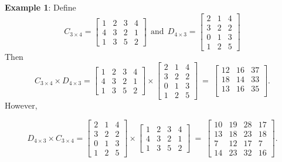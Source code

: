 \documentclass[
]{book}
\begin{document}
\textbf{Example 1}: Define
\[
C_{3\times 4} = \left[\begin{array}{ccccc} 
1& 2 & 3 & 4  \\ 
4 & 3 & 2 & 1 \\ 
1 & 3 & 5 & 2  
\end{array}
\right]
~
~
\text{and}
~
~
D_{4\times 3} = \left[\begin{array}{ccccc} 
2 & 1 & 4   \\ 
3 & 2 & 2  \\ 
0 & 1 & 3  \\
1 & 2 & 5
\end{array}
\right]
\]
Then
\[
C_{3\times 4} \times D_{4\times 3} = \left[\begin{array}{ccccc} 
1& 2 & 3 & 4  \\ 
4 & 3 & 2 & 1 \\ 
1 & 3 & 5 & 2  
\end{array}
\right]
\times
\left[\begin{array}{ccccc} 
2 & 1 & 4   \\ 
3 & 2 & 2  \\ 
0 & 1 & 3  \\
1 & 2 & 5
\end{array}
\right]
~
=
~
 \left[\begin{array}{ccccc} 
12 & 16 & 37   \\ 
18 & 14 & 33  \\ 
13 & 16 & 35  \\
\end{array}
\right].
\]
However,

\[
D_{4\times 3} \times C_{3\times 4} = 
\left[\begin{array}{ccccc} 
2 & 1 & 4   \\ 
3 & 2 & 2  \\ 
0 & 1 & 3  \\
1 & 2 & 5
\end{array}
\right]
\times
\left[\begin{array}{ccccc} 
1& 2 & 3 & 4  \\ 
4 & 3 & 2 & 1 \\ 
1 & 3 & 5 & 2  
\end{array}
\right]
~
=
~
 \left[\begin{array}{ccccc} 
10 & 19 & 28 & 17 \\ 
13 & 18 & 23 & 18\\ 
7 & 12 & 17 & 7\\
14 & 23 & 32 & 16
\end{array}
\right].
\]
\end{document}
